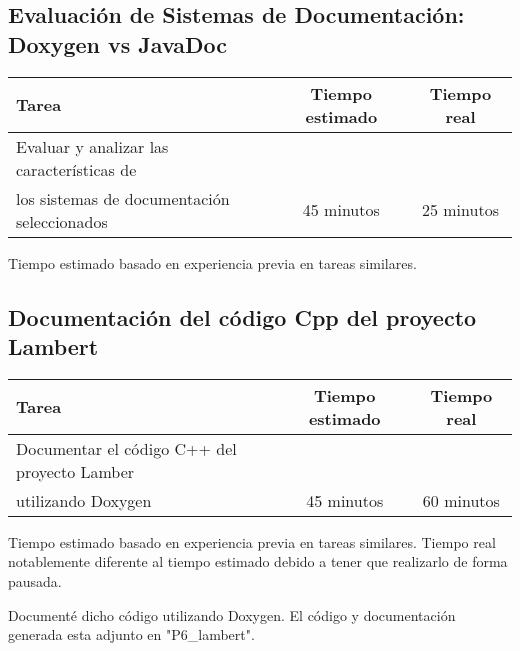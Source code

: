 \documentclass[12pt,a4paper]{article}
\begin{document}
\subsection{Evaluación de Sistemas de Documentación: Doxygen vs JavaDoc}
    \begin{center}
        \begin{tabular}{|l|c|c|}
            \hline
            \textbf{Tarea} & \textbf{Tiempo estimado} & \textbf{Tiempo real} \\
            \hline
            Evaluar y analizar las características de
\\los sistemas de documentación seleccionados & 45 minutos & 25 minutos \\
            \hline
        \end{tabular}
    \end{center}
    \begin{center}
        Tiempo estimado basado en experiencia previa en tareas similares.
    \end{center}


\subsection{Documentación del código Cpp del proyecto Lambert}
    \begin{center}
        \begin{tabular}{|l|c|c|}
            \hline
            \textbf{Tarea} & \textbf{Tiempo estimado} & \textbf{Tiempo real} \\
            \hline
            Documentar el código C++ del proyecto Lamber
\\utilizando Doxygen & 45 minutos & 60 minutos \\
            \hline
        \end{tabular}
    \end{center}
    \begin{center}
        Tiempo estimado basado en experiencia previa en tareas similares.
        \newline
        Tiempo real notablemente diferente al tiempo estimado debido a tener que realizarlo de forma pausada.
    \end{center}
Documenté dicho código utilizando Doxygen. El código y documentación generada esta adjunto en "P6\_lambert\/". 

\end{document}

